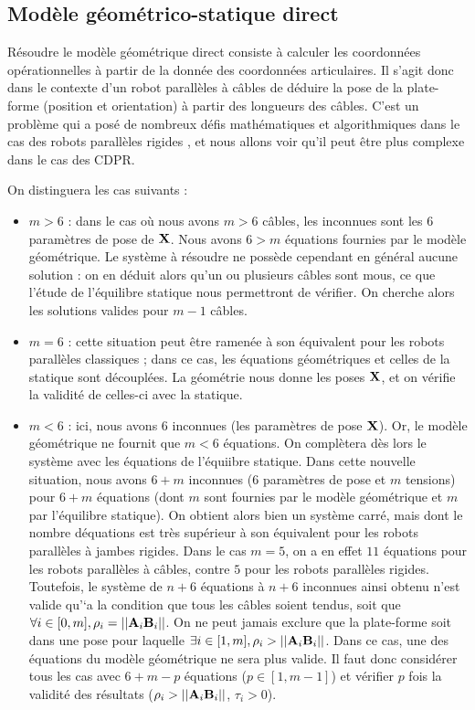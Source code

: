 \subsection{Modèle géométrico-statique direct}\label{chap0-1-4}

Résoudre le modèle géométrique direct consiste à calculer les coordonnées 
opéra\-tionnelles à partir de la donnée des coordonnées articulaires. Il s'agit 
donc dans le contexte d'un robot parallèles à câbles de déduire la pose de la 
plate-forme (position et orientation) à partir des longueurs des câbles. C'est 
un problème qui a posé de nombreux défis mathématiques et algorithmiques dans 
le 
cas des robots parallèles rigides \cite{merlet1997robots}, et nous allons voir 
qu'il peut \^etre plus complexe dans le cas des CDPR.

On distinguera les cas suivants :
\begin{itemize}
  \item $m > 6$ : dans le cas o\`u nous avons $m > 6$ c\^ables, les inconnues 
sont les $6$ param\`etres de pose de $\bf X$. Nous avons $6 > m$ \'equations 
fournies par le mod\`ele g\'eom\'etrique. Le syst\`eme \`a r\'esoudre ne 
poss\`ede cependant en g\'en\'eral aucune solution : on en d\'eduit alors qu'un 
ou plusieurs c\^ables sont mous, ce que l'\'etude de l'\'equilibre statique 
nous permettront de v\'erifier. On cherche alors les solutions valides pour 
$m-1$ c\^ables.
  \item $m = 6$ : cette situation peut \^etre ramen\'ee \`a son 
\'equivalent pour les robots parall\`eles classiques ; dans ce cas, les 
\'equations g\'eom\'etriques et celles de la statique sont d\'ecoupl\'ees. La 
g\'eom\'etrie nous donne les poses $\bf X$, et on v\'erifie la validit\'e de 
celles-ci avec la statique.
  \item $m < 6$ : ici, nous avons $6$ inconnues (les param\`etres de pose $\bf 
X$). Or, le mod\`ele g\'eom\'etrique ne fournit que $m < 6$ \'equations. On 
compl\`etera d\`es lors le syst\`eme avec les \'equations de l'\'equiibre 
statique. Dans cette nouvelle situation, nous avons $6 + m$ inconnues ($6$ 
param\`etres de pose et $m$ tensions) pour $6 + m$ \'equations (dont $m$ sont 
fournies par le mod\`ele g\'eom\'etrique et $m$ par l'\'equilibre statique). On 
obtient alors bien un syst\`eme carr\'e, mais dont le nombre d\'equations est 
tr\`es sup\'erieur \`a son \'equivalent pour les robots parall\`eles \`a jambes 
rigides. Dans le cas $m = 5$, on a en effet $11$ \'equations pour les robots 
parall\`eles \`a c\^ables, contre $5$ pour les robots parall\`eles rigides.
Toutefois, le syst\`eme de $n+6$ \'equations \`a $n+6$ inconnues ainsi obtenu 
n'est valide qu'`a la condition que tous les c\^ables soient tendus, soit que 
$\forall i \in [0,m], \rho_i = ||{\bf A}_i{\bf B}_i||$. On ne peut jamais 
exclure que la plate-forme soit dans une pose pour laquelle $\exists i \in 
[1,m], \rho_i > ||{\bf A}_i{\bf B}_i||$. Dans ce cas, une des \'equations du 
mod\`ele g\'eom\'etrique ne sera plus valide. Il faut donc consid\'erer tous 
les cas avec $6+m-p$ \'equations ($p \in [1, m-1]$) et v\'erifier $p$ fois la 
validit\'e des r\'esultats ($\rho_i > ||{\bf A}_i{\bf B}_i||$, $\tau_i > 0$). 
\end{itemize}

